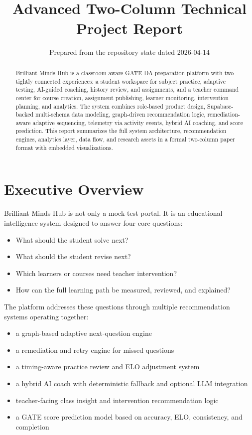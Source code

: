 \documentclass[10pt,twocolumn,a4paper]{article}
\title{\vspace{-0.9cm}\textbf{\project}\\Advanced Two-Column Technical Project Report}
\author{Prepared from the repository state dated 2026-04-14}
\date{}
\newcommand{\project}{Brilliant Minds Hub}
\begin{document}
\maketitle
\thispagestyle{empty}

\begin{abstract}
\project{} is a classroom-aware GATE DA preparation platform with two tightly connected experiences: a student workspace for subject practice, adaptive testing, AI-guided coaching, history review, and assignments, and a teacher command center for course creation, assignment publishing, learner monitoring, intervention planning, and analytics. The system combines role-based product design, Supabase-backed multi-schema data modeling, graph-driven recommendation logic, remediation-aware adaptive sequencing, telemetry via activity events, hybrid AI coaching, and score prediction. This report summarizes the full system architecture, recommendation engines, analytics layer, data flow, and research assets in a formal two-column paper format with embedded visualizations.
\end{abstract}

\section{Executive Overview}
\project{} is not only a mock-test portal. It is an educational intelligence system designed to answer four core questions:

\begin{itemize}
  \item What should the student solve next?
  \item What should the student revise next?
  \item Which learners or courses need teacher intervention?
  \item How can the full learning path be measured, reviewed, and explained?
\end{itemize}

The platform addresses these questions through multiple recommendation systems operating together:

\begin{itemize}
  \item a graph-based adaptive next-question engine
  \item a remediation and retry engine for missed questions
  \item a timing-aware practice review and ELO adjustment system
  \item a hybrid AI coach with deterministic fallback and optional LLM integration
  \item teacher-facing class insight and intervention recommendation logic
  \item a GATE score prediction model based on accuracy, ELO, consistency, and completion
\end{itemize}
\end{document}
